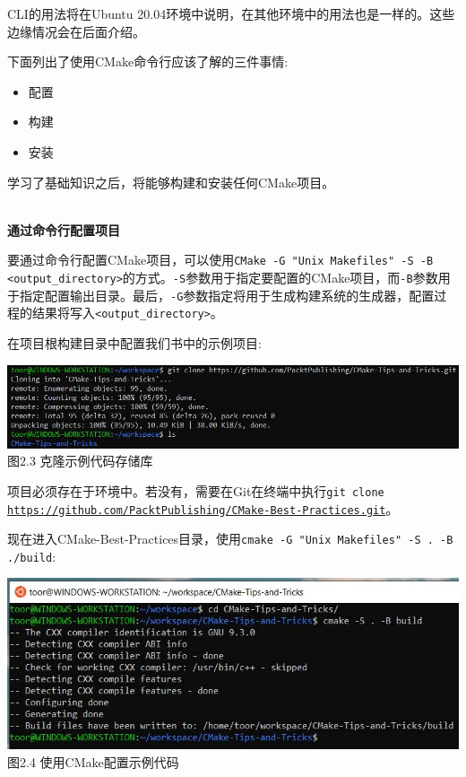 CLI的用法将在Ubuntu 20.04环境中说明，在其他环境中的用法也是一样的。这些边缘情况会在后面介绍。


下面列出了使用CMake命令行应该了解的三件事情:

\begin{itemize}
\item 
配置

\item 
构建

\item 
安装
\end{itemize}

学习了基础知识之后，将能够构建和安装任何CMake项目。

\hspace*{\fill} \\ %
\noindent
\textbf{通过命令行配置项目}

要通过命令行配置CMake项目，可以使用\texttt{CMake -G "Unix Makefiles" -S  -B <output\_directory>}的方式。\texttt{-S}参数用于指定要配置的CMake项目，而\texttt{-B}参数用于指定配置输出目录。最后，\texttt{-G}参数指定将用于生成构建系统的生成器，配置过程的结果将写入\texttt{<output\_directory>}。

在项目根构建目录中配置我们书中的示例项目:

\begin{center}
\includegraphics[width=1.\textwidth]{content/1/chapter2/images/3.jpg}\\
图2.3 克隆示例代码存储库
\end{center}

\begin{tcolorbox}[colback=webgreen!5!white,colframe=webgreen!75!black,title=重要Note]
项目必须存在于环境中。若没有，需要在Git在终端中执行\texttt{git clone \url{https://github.com/PacktPublishing/CMake-Best-Practices.git}}。
\end{tcolorbox}

现在进入CMake-Best-Practices目录，使用\texttt{cmake -G "Unix Makefiles" -S . -B ./build}:

\begin{center}
\includegraphics[width=1.\textwidth]{content/1/chapter2/images/4.jpg}\\
图2.4 使用CMake配置示例代码
\end{center}

